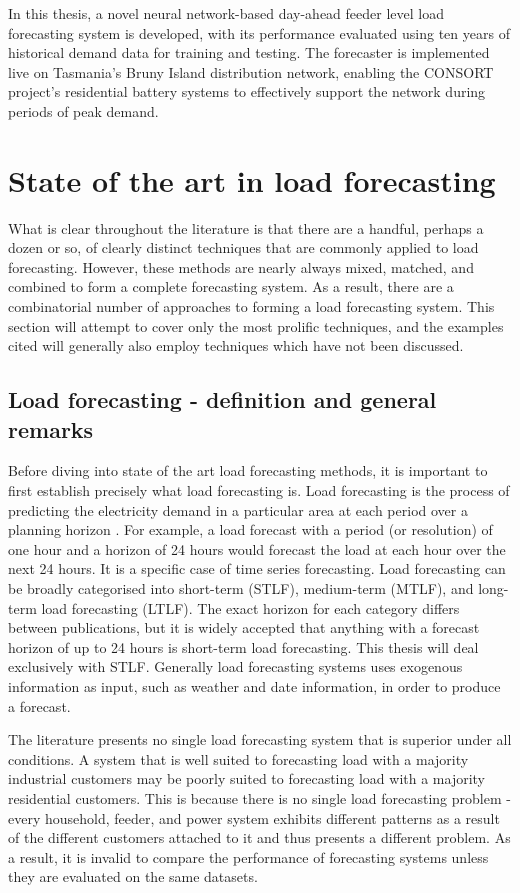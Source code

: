 In this thesis, a novel neural network-based day-ahead feeder level load forecasting system is developed, with its performance evaluated using ten years of historical demand data for training and testing. The forecaster is implemented live on Tasmania's Bruny Island distribution network, enabling the CONSORT project's residential battery systems to effectively support the network during periods of peak demand.

\section{State of the art in load forecasting}
What is clear throughout the literature is that there are a handful, perhaps a dozen or so, of clearly distinct techniques that are commonly applied to load forecasting.
However, these methods are nearly always mixed, matched, and combined to form a complete forecasting system.
As a result, there are a combinatorial number of approaches to forming a load forecasting system.
This section will attempt to cover only the most prolific techniques, and the examples cited will generally also employ techniques which have not been discussed. 

\subsection{Load forecasting - definition and general remarks}
Before diving into state of the art load forecasting methods, it is important to first establish precisely what load forecasting is.
Load forecasting is the process of predicting the electricity demand in a particular area at each period over a planning horizon \citep{Weron2006}.
For example, a load forecast with a period (or resolution) of one hour and a horizon of 24 hours would forecast the load at each hour over the next 24 hours.
It is a specific case of time series forecasting.
Load forecasting can be broadly categorised into short-term (STLF), medium-term (MTLF), and long-term load forecasting (LTLF).
The exact horizon for each category differs between publications, but it is widely accepted that anything with a forecast horizon of up to 24 hours is short-term load forecasting.
This thesis will deal exclusively with STLF.
Generally load forecasting systems uses exogenous information as input, such as weather and date information, in order to produce a forecast.

The literature presents no single load forecasting system that is superior under all conditions.
A system that is well suited to forecasting load with a majority industrial customers may be poorly suited to forecasting load with a majority residential customers.
This is because there is no single load forecasting problem - every household, feeder, and power system exhibits different patterns as a result of the different customers attached to it and thus presents a different problem.
As a result, it is invalid to compare the performance of forecasting systems unless they are evaluated on the same datasets.


